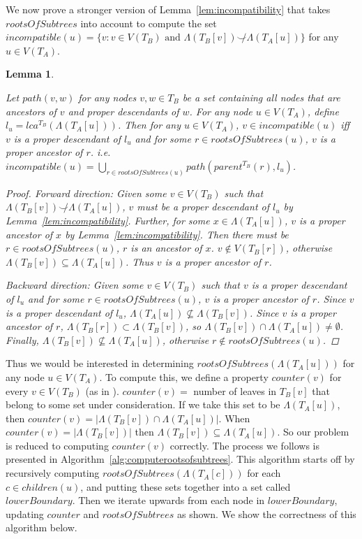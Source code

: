 \documentclass{article}
\newcommand{\compatible}{\smile}
\newcommand{\leafset}{\Lambda}
\newtheorem{incompatibilityrootsofsubtrees}[incompatibility]{Lemma}
\begin{document}
    We now prove a stronger version of Lemma~\ref{lem:incompatibility} that takes $rootsOfSubtrees$ into account to compute the set $incompatible(u) = \{v : v \in V(T_B) \text{ and } \leafset(T_B[v]) \not\compatible \leafset(T_A[u])\}$ for any $u \in V(T_A)$.

    \begin{incompatibilityrootsofsubtrees}
        \label{lem:incompatibilityrootsofsubtrees}

        Let $path(v, w)$ for any nodes $v, w \in T_B$ be a set containing all nodes that are ancestors of $v$ and proper descendants of $w$. For any node $u \in V(T_A)$, define $l_u = lca^{T_B}(\leafset(T_A[u]))$. Then for any $u \in V(T_A)$, $v \in incompatible(u)$ iff $v$ is a proper descendant of $l_u$ and for some $r \in rootsOfSubtrees(u)$, $v$ is a proper ancestor of $r$. i.e. $incompatible(u) = \bigcup_{r \in rootsOfSubtrees(u)} path(parent^{T_B}(r), l_u)$.

        \begin{proof}
            \textit{Forward direction}: Given some $v \in V(T_B)$ such that $\leafset(T_B[v]) \not\compatible \leafset(T_A[u])$, $v$ must be a proper descendant of $l_u$ by Lemma~\ref{lem:incompatibility}. Further, for some $x \in \leafset(T_A[u])$, $v$ is a proper ancestor of $x$ by Lemma~\ref{lem:incompatibility}. Then there must be $r \in rootsOfSubtrees(u)$, $r$ is an ancestor of $x$. $v \not\in V(T_B[r])$, otherwise $\leafset(T_B[v]) \subseteq \leafset(T_A[u])$. Thus $v$ is a proper ancestor of $r$.

            \textit{Backward direction}: Given some $v \in V(T_B)$ such that $v$ is a proper descendant of $l_u$ and for some $r \in rootsOfSubtrees(u)$, $v$ is a proper ancestor of $r$. Since $v$ is a proper descendant of $l_u$, $\leafset(T_A[u]) \not\subseteq \leafset(T_B[v])$. Since $v$ is a proper ancestor of $r$, $\leafset(T_B[r]) \subset \leafset(T_B[v])$, so $\leafset(T_B[v]) \cap \leafset(T_A[u]) \neq \emptyset$. Finally, $\leafset(T_B[v]) \not\subseteq \leafset(T_A[u])$, otherwise $r \not\in rootsOfSubtrees(u)$.
        \end{proof}
    \end{incompatibilityrootsofsubtrees}

    Thus we would be interested in determining $rootsOfSubtrees(\leafset(T_A[u]))$ for any node $u \in V(T_A)$. To compute this, we define a property $counter(v)$ for every $v \in V(T_B)$ (as in \cite{jansson2018algorithms}). $counter(v) =$ number of leaves in $T_B[v]$ that belong to some set under consideration. If we take this set to be $\leafset(T_A[u])$, then $counter(v) = |\leafset(T_B[v]) \cap \leafset(T_A[u])|$. When $counter(v) = |\leafset(T_B[v])|$ then $\leafset(T_B[v]) \subseteq \leafset(T_A[u])$. So our problem is reduced to computing $counter(v)$ correctly. The process we follows is presented in Algorithm~\ref{alg:computerootsofsubtrees}. This algorithm starts off by recursively computing $rootsOfSubtrees(\leafset(T_A[c]))$ for each $c \in children(u)$, and putting these sets together into a set called $lowerBoundary$. Then we iterate upwards from each node in $lowerBoundary$, updating $counter$ and $rootsOfSubtrees$ as shown. We show the correctness of this algorithm below.
\end{document}
